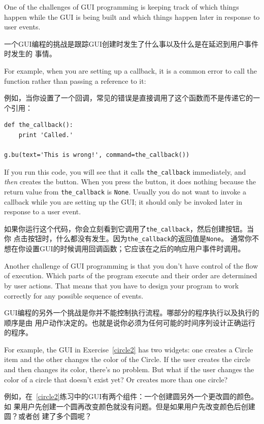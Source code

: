 \documentclass[10pt]{book}
\begin{document}
\begin{CJK}{UTF8}{gbsn}
One of the challenges of GUI programming is keeping track of
which things happen while the GUI is being built and which
things happen later in response to user events.

一个GUI编程的挑战是跟踪GUI创建时发生了什么事以及什么是在延迟到用户事件时发生的
事情。

For example, when you are setting up a callback, it is a common error
to call the function rather than passing a reference to it:

例如，当你设置了一个回调，常见的错误是直接调用了这个函数而不是传递它的一个引用：

\begin{verbatim}
def the_callback():
    print 'Called.'

g.bu(text='This is wrong!', command=the_callback())
\end{verbatim}
%
If you run this code, you will see that it calls \verb"the_callback"
immediately, and {\em then} creates the button.  When you press the
button, it does nothing because the return value from 
\verb"the_callback" is {\tt None}.
Usually you do not want to invoke a callback while you are
setting up the GUI; it should only be invoked later in response to
a user event.

如果你运行这个代码，你会立刻看到它调用了\verb"the_callback"，然后创建按钮。当你
点击按钮时，什么都没有发生。因为\verb"the_callback"的返回值是{\tt None}。
通常你不想在你设置GUI的时候调用回调函数；它应该在之后的响应用户事件时调用。

Another challenge of GUI programming is that you don't have control
of the flow of execution.  Which parts of the program execute
and their order are determined by user actions.
That means that you have to design your program to work correctly
for any possible sequence of events.

GUI编程的另外一个挑战是你并不能控制执行流程。哪部分的程序执行以及执行的顺序是由
用户动作决定的。也就是说你必须为任何可能的时间序列设计正确运行的程序。

For example, the GUI in Exercise~\ref{circle2} has two widgets:
one creates a Circle item and the other changes the color of the
Circle.  If the user creates the circle and then changes its color,
there's no problem.  But what if the user changes the color of
a circle that doesn't exist yet?  Or creates more than one circle?

例如，在~\ref{circle2}练习中的GUI有两个组件：一个创建圆另外一个更改圆的颜色。如
果用户先创建一个圆再改变颜色就没有问题。但是如果用户先改变颜色后创建圆？或者创
建了多个圆呢？


\end{CJK}
\end{document}
